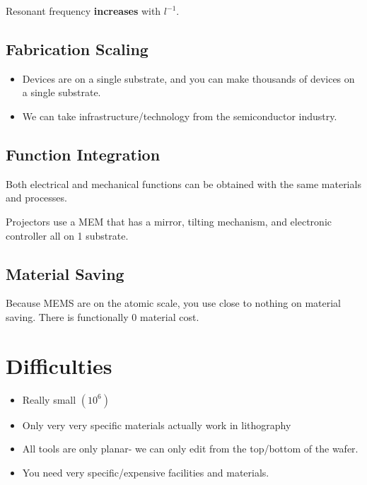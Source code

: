 \documentclass[fleqn]{report}
\begin{document}
Resonant frequency \textbf{increases} with $l^{-1}$.

\subsection{Fabrication Scaling}
\begin{itemize}
    \item 
    Devices are on a single substrate, and you can make 
    thousands of devices on a single substrate. 
    \item 
    We can take infrastructure/technology from the semiconductor industry. 
\end{itemize}

\subsection{Function Integration}
Both electrical and mechanical functions can be obtained 
with the same materials and processes. 

Projectors use a MEM that has a mirror, tilting mechanism, 
and electronic controller all on 1 substrate. 

\subsection{Material Saving}
Because MEMS are on the atomic scale, you use close to 
nothing on material saving. There is functionally 
0 material cost. 

\section{Difficulties}
\begin{itemize}
    \item 
    Really small $(10^6)$
    \item 
    Only very very specific materials actually work in lithography
    \item 
    All tools are only planar- we can only edit from the 
    top/bottom of the wafer. 
    \item 
    You need very specific/expensive facilities and materials.
\end{itemize}
\end{document}

